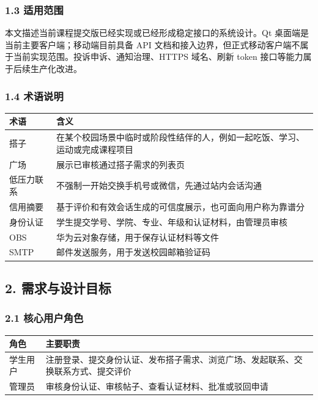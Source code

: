 \documentclass[
]{ctexart}
\begin{document}
\hypertarget{ux9002ux7528ux8303ux56f4}{%
\subsubsection{1.3 适用范围}\label{ux9002ux7528ux8303ux56f4}}

本文描述当前课程提交版已经实现或已经形成稳定接口的系统设计。Qt
桌面端是当前主要客户端；移动端目前具备 API
文档和接入边界，但正式移动客户端不属于当前实现范围。投诉申诉、通知治理、HTTPS
域名、刷新 token 接口等能力属于后续生产化改进。

\hypertarget{ux672fux8bedux8bf4ux660e}{%
\subsubsection{1.4 术语说明}\label{ux672fux8bedux8bf4ux660e}}

\begin{longtable}[]{@{}ll@{}}
\toprule
术语 & 含义 \\
\midrule
\endhead
搭子 &
在某个校园场景中临时或阶段性结伴的人，例如一起吃饭、学习、运动或完成课程项目 \\
广场 & 展示已审核通过搭子需求的列表页 \\
低压力联系 & 不强制一开始交换手机号或微信，先通过站内会话沟通 \\
信用摘要 & 基于评价和有效会话生成的可信度展示，也可面向用户称为靠谱分 \\
身份认证 & 学生提交学号、学院、专业、年级和认证材料，由管理员审核 \\
OBS & 华为云对象存储，用于保存认证材料等文件 \\
SMTP & 邮件发送服务，用于发送校园邮箱验证码 \\
\bottomrule
\end{longtable}

\hypertarget{ux9700ux6c42ux4e0eux8bbeux8ba1ux76eeux6807}{%
\subsection{2.
需求与设计目标}\label{ux9700ux6c42ux4e0eux8bbeux8ba1ux76eeux6807}}

\hypertarget{ux6838ux5fc3ux7528ux6237ux89d2ux8272}{%
\subsubsection{2.1
核心用户角色}\label{ux6838ux5fc3ux7528ux6237ux89d2ux8272}}

\begin{longtable}[]{@{}ll@{}}
\toprule
角色 & 主要职责 \\
\midrule
\endhead
学生用户 &
注册登录、提交身份认证、发布搭子需求、浏览广场、发起联系、交换联系方式、提交评价 \\
管理员 & 审核身份认证、审核帖子、查看认证材料、批准或驳回申请 \\
\bottomrule
\end{longtable}
\end{document}
